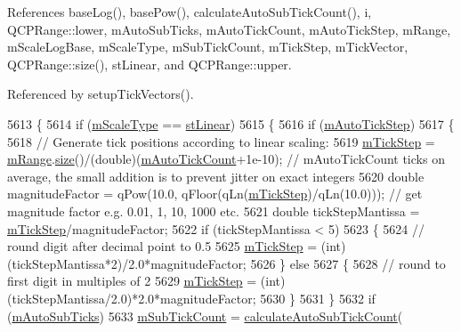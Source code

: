 References base\+Log(), base\+Pow(), calculate\+Auto\+Sub\+Tick\+Count(), i, Q\+C\+P\+Range\+::lower, m\+Auto\+Sub\+Ticks, m\+Auto\+Tick\+Count, m\+Auto\+Tick\+Step, m\+Range, m\+Scale\+Log\+Base, m\+Scale\+Type, m\+Sub\+Tick\+Count, m\+Tick\+Step, m\+Tick\+Vector, Q\+C\+P\+Range\+::size(), st\+Linear, and Q\+C\+P\+Range\+::upper.



Referenced by setup\+Tick\+Vectors().


\begin{DoxyCode}
5613 \{
5614   \textcolor{keywordflow}{if} (\hyperlink{class_q_c_p_axis_ad706039549cbbbec5fcb2baf7894e04d}{mScaleType} == \hyperlink{class_q_c_p_axis_a36d8e8658dbaa179bf2aeb973db2d6f0aff6e30a11a828bc850caffab0ff994f6}{stLinear})
5615   \{
5616     \textcolor{keywordflow}{if} (\hyperlink{class_q_c_p_axis_aada8934a5c44978653031782aa37d101}{mAutoTickStep})
5617     \{
5618       \textcolor{comment}{// Generate tick positions according to linear scaling:}
5619       \hyperlink{class_q_c_p_axis_a4fe96830fc5a2711e20fe5edccfe2ed3}{mTickStep} = \hyperlink{class_q_c_p_axis_a1ee36773c49062d751560e11f90845f7}{mRange}.\hyperlink{class_q_c_p_range_afa57c13049b965edb6fd1c00ac56338a}{size}()/(double)(\hyperlink{class_q_c_p_axis_a499fbb67111e4b204738f6c1aa28d842}{mAutoTickCount}+1e-10); \textcolor{comment}{//
       mAutoTickCount ticks on average, the small addition is to prevent jitter on exact integers}
5620       \textcolor{keywordtype}{double} magnitudeFactor = qPow(10.0, qFloor(qLn(\hyperlink{class_q_c_p_axis_a4fe96830fc5a2711e20fe5edccfe2ed3}{mTickStep})/qLn(10.0))); \textcolor{comment}{// get magnitude
       factor e.g. 0.01, 1, 10, 1000 etc.}
5621       \textcolor{keywordtype}{double} tickStepMantissa = \hyperlink{class_q_c_p_axis_a4fe96830fc5a2711e20fe5edccfe2ed3}{mTickStep}/magnitudeFactor;
5622       \textcolor{keywordflow}{if} (tickStepMantissa < 5)
5623       \{
5624         \textcolor{comment}{// round digit after decimal point to 0.5}
5625         \hyperlink{class_q_c_p_axis_a4fe96830fc5a2711e20fe5edccfe2ed3}{mTickStep} = (int)(tickStepMantissa*2)/2.0*magnitudeFactor;
5626       \} \textcolor{keywordflow}{else}
5627       \{
5628         \textcolor{comment}{// round to first digit in multiples of 2}
5629         \hyperlink{class_q_c_p_axis_a4fe96830fc5a2711e20fe5edccfe2ed3}{mTickStep} = (int)(tickStepMantissa/2.0)*2.0*magnitudeFactor;
5630       \}
5631     \}
5632     \textcolor{keywordflow}{if} (\hyperlink{class_q_c_p_axis_aaae980b0d193d959674e314dbb6c2c3b}{mAutoSubTicks})
5633       \hyperlink{class_q_c_p_axis_ad70198e6ae2801fc409bc3caec707da9}{mSubTickCount} = \hyperlink{class_q_c_p_axis_a3c5c045019fcdc0843a3e064eda7478a}{calculateAutoSubTickCount}(

\end{DoxyCode}
